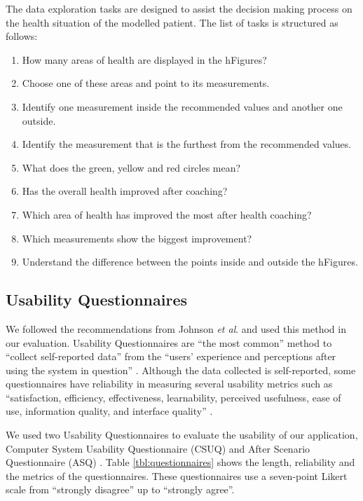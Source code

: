 \documentclass[twocolumn]{bmcart}%
\begin{document}
The data exploration tasks are designed to assist the decision making process on the health situation of the modelled patient. The list of tasks is structured as follows:
\begin{enumerate}
\item How many areas of health are displayed in the hFigures?
\item Choose one of these areas and point to its measurements.
\item Identify one measurement inside the recommended values and another one outside.
\item Identify the measurement that is the furthest from the recommended values.
\item What does the green, yellow and red circles mean?
\item Has the overall health improved after coaching?
\item Which area of health has improved the most after health coaching?
\item Which measurements show the biggest improvement?
\item Understand the difference between the points inside and outside the hFigures.
\end{enumerate}

\subsection*{Usability Questionnaires}

We followed the recommendations from Johnson \textit{et al}. and used this method in our evaluation. Usability Questionnaires are ``the most common'' method to ``collect self-reported data'' from the ``users’ experience and perceptions after using the system in question'' \cite{johnson2011ehr}. Although the data collected is self-reported, some questionnaires have reliability in measuring several usability metrics such as ``satisfaction, efficiency, effectiveness, learnability, perceived usefulness, ease of use, information quality, and interface quality'' \cite{johnson2011ehr}.

We used two Usability Questionnaires to evaluate the usability of our application, Computer System Usability Questionnaire (CSUQ) and After Scenario Questionnaire (ASQ) \cite{lewis1995ibm}. Table \ref{tbl:questionnaires} shows the length, reliability and the metrics of the questionnaires. These questionnaires use a seven-point Likert scale from ``strongly disagree'' up to ``strongly agree''.
\end{document}
